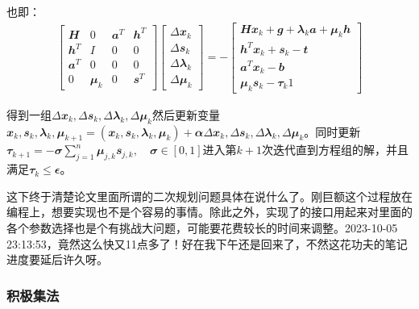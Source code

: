 也即：
\begin{align}
  \begin{bmatrix}
    \mathbfit{H} & 0& \mathbfit{a}^T & \mathbfit{h}^T\\
    \mathbfit{h}^T & I & 0 & 0\\
    \mathbfit{a}^T & 0 & 0 & 0\\
    0 & \mathbfit{\mu}_k & 0 & \mathbfit{s}^T
  \end{bmatrix}
  \begin{bmatrix}
    \Delta\mathbfit{x}_k\\
    \Delta\mathbfit{s}_k\\
    \Delta\mathbfit{\lambda}_k\\
    \Delta\mathbfit{\mu}_k
  \end{bmatrix}=-
  \begin{bmatrix}
    \mathbfit{H}\mathbfit{x}_k+\mathbfit{g}+\mathbfit{\lambda}_k\mathbfit{a}+\mathbfit{\mu}_k\mathbfit{h}\\
    \mathbfit{h}^T\mathbfit{x}_k+\mathbfit{s}_k-\mathbfit{t}\\
    \mathbfit{a}^T\mathbfit{x}_k-\mathbfit{b}\\
    \mathbfit{\mu}_k\mathbfit{s}_k-\mathbfit{\tau}_k\mathbfit{1}
  \end{bmatrix}
\end{align}

得到一组$\Delta\mathbfit{x}_k,\Delta\mathbfit{s}_k,\Delta\mathbfit{\lambda}_k,\Delta\mathbfit{\mu}_k$然后更新变量$\mathbfit{x}_k,\mathbfit{s}_k,\mathbfit{\lambda}_k,\mathbfit{\mu}_{k+1}=(\mathbfit{x}_k,\mathbfit{s}_k,\mathbfit{\lambda}_k,\mathbfit{\mu}_k)+\mathbfit{\alpha}\Delta\mathbfit{x}_k,\Delta\mathbfit{s}_k,\Delta\mathbfit{\lambda}_k,\Delta\mathbfit{\mu}_k$。同时更新$\mathbfit{\tau}_{k+1}=-\mathbfit{\sigma}\sum_{j=1}^{n}\mathbfit{\mu}_{j,k}\mathbfit{s}_{j,k}, \quad \mathbfit{\sigma} \in [0,1]$进入第$k+1$次迭代直到方程组的解，并且满足$\mathbfit{\tau}_k\leq\mathbfit{\epsilon}$。
\begin{note}
  这下终于清楚论文里面所谓的二次规划问题具体在说什么了。刚巨额这个过程放在编程上，想要实现也不是个容易的事情。除此之外，实现了的接口用起来对里面的各个参数选择也是个有挑战大问题，可能要花费较长的时间来调整。2023-10-05 23:13:53，竟然这么快又11点多了！好在我下午还是回来了，不然这花功夫的笔记进度要延后许久呀。
\end{note}




\subsubsection{积极集法}


